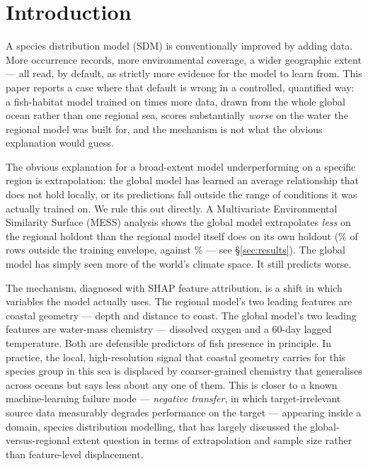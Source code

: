 %

\section{Introduction}

A species distribution model (SDM) is conventionally improved by adding data.
More occurrence records, more environmental coverage, a wider geographic
extent --- all read, by default, as strictly more evidence for the model to
learn from. This paper reports a case where that default is wrong in a
controlled, quantified way: a fish-habitat model trained on \DataMultiple{}
times more data, drawn from the whole global ocean rather than one regional
sea, scores substantially \emph{worse} on the water the regional model was
built for, and the mechanism is not what the obvious explanation would guess.

The obvious explanation for a broad-extent model underperforming on a specific
region is extrapolation: the global model has learned an average relationship
that does not hold locally, or its predictions fall outside the range of
conditions it was actually trained on. We rule this out directly. A
Multivariate Environmental Similarity Surface (MESS) analysis
\citep{elith2010} shows the global model extrapolates \emph{less} on the
regional holdout than the regional model itself does on its own holdout
(\MESSFracGlobal{}\% of rows outside the training envelope, against
\MESSFracRegion{}\% --- see \S\ref{sec:results}). The global model has simply
seen more of the world's climate space. It still predicts worse.

The mechanism, diagnosed with SHAP feature attribution, is a shift in which
variables the model actually uses. The regional model's two leading features
are coastal geometry --- depth and distance to coast. The global model's two
leading features are water-mass chemistry --- dissolved oxygen and a 60-day
lagged temperature. Both are defensible predictors of fish presence in
principle. In practice, the local, high-resolution signal that coastal
geometry carries for this species group in this sea is displaced by
coarser-grained chemistry that generalises across oceans but says less about
any one of them. This is closer to a known machine-learning failure mode ---
\emph{negative transfer}, in which target-irrelevant source data measurably
degrades performance on the target \citep{zhang2021survey} --- appearing
inside a domain, species distribution modelling, that has largely discussed
the global-versus-regional extent question in terms of extrapolation and
sample size rather than feature-level displacement.

